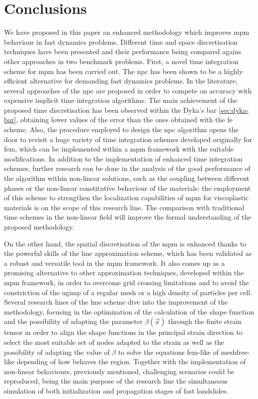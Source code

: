 \documentclass[preprint,12pt,a4paper]{elsarticle}
\begin{document}
\section{Conclusions}
\label{sec:conclusions}
We have proposed in this paper an enhanced methodology which improves \acrfull{mpm} behaviour in fast dynamics problems. Different time and space discretisation techniques have been presented and their performance being compared agains other approaches in two benchmark problems.
First, a novel time integration scheme for
\acrshort{mpm} has been carried out. The \acrshort{npc} has been
  shown to be a highly efficient alternative for demanding fast dynamics problems. In the literature, several approaches of the \acrshort{npc} are proposed in order to compete on accuracy with expensive implicit time integration algorithms. The main achievement of the proposed time discretisation has been observed within the Dyka's bar \ref{sec:dyka-bar}, obtaining lower values of the error than the ones obtained with the \acrfull{fe} scheme.
Also, the procedure employed to design the \acrshort{npc} algorithm opens the
door to revisit a huge variety of time integration schemes developed
originally for \acrshort{fem}, which can be implemented within a
  \acrshort{mpm} framework with the suitable modifications. In
addition to the implementation of enhanced time integration schemes, further
research can be done in the analysis of the good performance of the algorithm within non-linear solutions, such as the coupling between different phases or the non-linear constitutive behaviour of the materials: the employment of this scheme to strengthen the localization capabilities of \acrshort{mpm} for viscoplastic materials is on the scope of this research line. The comparison with traditional time schemes in the non-linear field will improve the formal understanding of the proposed methodology.

On the other hand, the spatial discretisation of the \acrshort{mpm} is enhanced thanks to the powerful skills of the \acrfull{lme} approximation scheme, which has been validated as a robust and versatile
tool in the \acrshort{mpm} framework. It also comes up as a promising
alternative to other approximation techniques, developed within the
\acrshort{mpm} framework, in order to overcome grid crossing limitations and to avoid the
constriction of the \acrshort{ugimp} of a regular mesh or a high
density of particles per cell. Several research lines of the \acrshort{lme} scheme dive into the improvement of the methodology, focusing in the optimization of the calculation of the shape function and the possibility of adapting the parameter $\beta(\vec{x})$ through the finite strain
tensor in order to align the shape functions in the principal strain
direction to select the most suitable set of nodes adapted to the strain as well as the possibility of adapting the value of $\beta$ to solve the equations
\acrshort{fem}-like of meshfree-like depending of how behaves the
region. Together with the implementation of non-linear behaviours, previously mentioned, challenging
scenarios could be reproduced, being the main purpose of the research line the simultaneous simulation of both initialization and
propagation stages of fast landslides.
\end{document}
